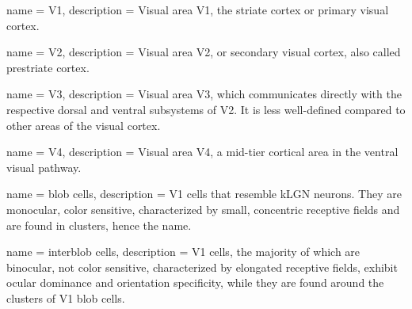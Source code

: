 

{
	name = {V1},
	description = {Visual area V1, the striate cortex or primary visual cortex.\newline}
}

{
	name = {V2},
	description = {Visual area V2, or secondary visual cortex, also called prestriate cortex.\newline}
}

{
	name = {V3},
	description = {Visual area V3, which communicates directly with the respective dorsal and ventral subsystems of V2. It is less well-defined compared to other areas of the visual cortex.\newline}
}

{
	name = {V4},
	description = {Visual area V4, a mid-tier cortical area in the ventral visual pathway.\newline}
}

{
	name = {blob cells},
	description = {V1 cells that resemble kLGN neurons. They are monocular, color sensitive, characterized by small, concentric receptive fields and are found in clusters, hence the name.\newline}
}

{
	name = {interblob cells},
	description = {V1 cells, the majority of which are binocular, not color sensitive, characterized by elongated receptive fields, exhibit ocular dominance and orientation specificity, while they are found around the clusters of V1 blob cells.\newline}
}

